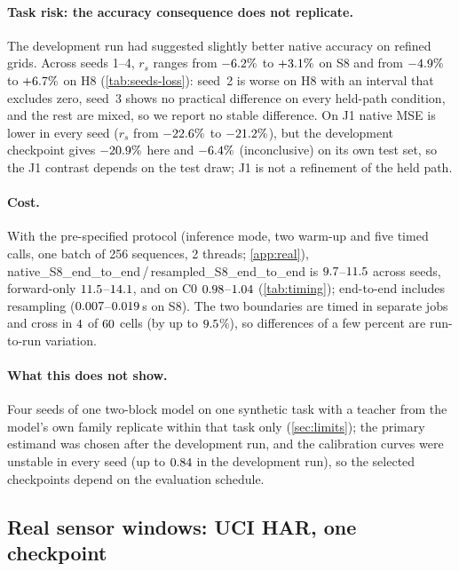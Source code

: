 \documentclass{article}
\theoremstyle{plain}
\theoremstyle{definition}
\theoremstyle{remark}
\begin{document}
\paragraph{Task risk: the accuracy consequence does not replicate.}
The development run had suggested slightly better native accuracy on refined grids.
Across seeds 1--4, $r_s$ ranges from $-6.2\%$ to $+3.1\%$ on S8 and from $-4.9\%$ to $+6.7\%$ on H8 (\cref{tab:seeds-loss}): seed~2 is worse on H8 with an interval that excludes zero, seed~3 shows no practical difference on every held-path condition, and the rest are mixed, so we report no stable difference.
On J1 native MSE is lower in every seed ($r_s$ from $-22.6\%$ to $-21.2\%$), but the development checkpoint gives $-20.9\%$ here and $-6.4\%$ (inconclusive) on its own test set, so the J1 contrast depends on the test draw; J1 is not a refinement of the held path.

\paragraph{Cost.}
With the pre-specified protocol (inference mode, two warm-up and five timed calls, one batch of 256 sequences, 2 threads; \cref{app:real}), native\_S8\_end\_to\_end\,/\,resampled\_S8\_end\_to\_end is $9.7$--$11.5$ across seeds, forward-only $11.5$--$14.1$, and on C0 $0.98$--$1.04$ (\cref{tab:timing}); end-to-end includes resampling ($0.007$--$0.019$\,s on S8).
The two boundaries are timed in separate jobs and cross in $4$ of $60$ cells (by up to $9.5$\%), so differences of a few percent are run-to-run variation.

\paragraph{What this does not show.}
Four seeds of one two-block model on one synthetic task with a teacher from the model's own family replicate within that task only (\cref{sec:limits}); the primary estimand was chosen after the development run, and the calibration curves were unstable in every seed (up to $0.84$ in the development run), so the selected checkpoints depend on the evaluation schedule.

\subsection{Real sensor windows: UCI HAR, one checkpoint}
\label{sec:har}
\end{document}
